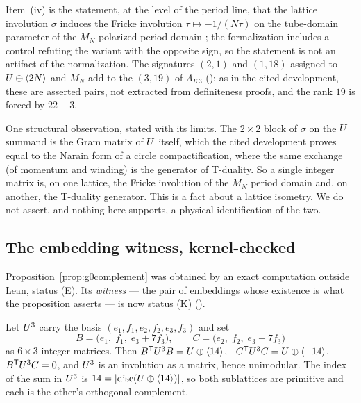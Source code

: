 Item~(iv) is the statement, at the level of the period line, that the lattice
involution $\sigma$ induces the Fricke involution $\tau\mapsto-1/(N\tau)$ on
the tube-domain parameter of the $M_N$-polarized period domain
\cite{Dolgachev1996}; the formalization includes a control refuting the
variant with the opposite sign, so the statement is not an artifact of the
normalization. The signatures $(2,1)$ and $(1,18)$ assigned to
$U\oplus\langle 2N\rangle$ and $M_N$ add to the $(3,19)$ of $\Lambda_{K3}$
(); as in the cited development, these are asserted
pairs, not extracted from definiteness proofs, and the rank $19$ is forced by
$22-3$.

One structural observation, stated with its limits. The $2\times2$ block of
$\sigma$ on the $U$ summand is the Gram matrix of $U$ itself, which the cited
development proves equal to the Narain form of a circle compactification, where
the same exchange (of momentum and winding) is the generator of T-duality. So a
single integer matrix is, on one lattice, the Fricke involution of the $M_N$
period domain and, on another, the T-duality generator. This is a fact about a
lattice isometry. We do not assert, and nothing here supports, a physical
identification of the two.

\subsection{The embedding witness, kernel-checked}\label{subsec:embedding}

Proposition~\ref{prop:g0complement} was obtained by an exact computation outside
Lean, status (E). Its \emph{witness} --- the pair of embeddings whose existence
is what the proposition asserts --- is now status (K)
().

\begin{proposition}[status (K)]\label{prop:embedding}
Let $U^3$ carry the basis $(e_1,f_1,e_2,f_2,e_3,f_3)$ and set
\[
  B = \bigl(e_1,\; f_1,\; e_3+7f_3\bigr), \qquad
  C = \bigl(e_2,\; f_2,\; e_3-7f_3\bigr)
\]
as $6\times3$ integer matrices. Then
$B^{\mathsf T}U^3B = U\oplus\langle 14\rangle$, \
$C^{\mathsf T}U^3C = U\oplus\langle -14\rangle$, \
$B^{\mathsf T}U^3C = 0$, and $U^3$ is an involution as a matrix, hence
unimodular. The index of the sum in $U^3$ is $14=\lvert\operatorname{disc}
(U\oplus\langle 14\rangle)\rvert$, so both sublattices are primitive and each is the
other's orthogonal complement.
\end{proposition}

